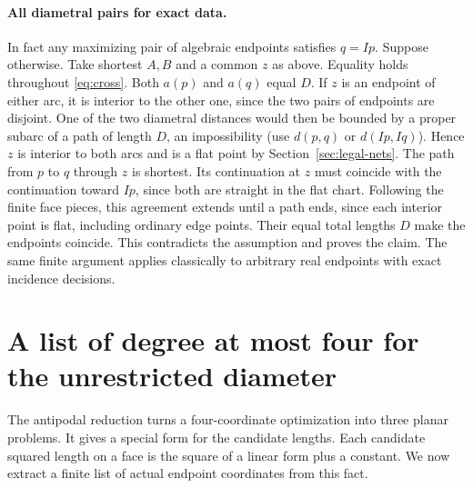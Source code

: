 \documentclass[10pt,letterpaper]{article}
\begin{document}
\paragraph{All diametral pairs for exact data.}
In fact any maximizing pair of algebraic endpoints satisfies $q=Ip$.
Suppose otherwise. Take shortest $A,B$ and a common $z$ as above.
Equality holds throughout \eqref{eq:cross}. Both $a(p)$ and $a(q)$
equal $D$. If $z$ is an endpoint of either arc, it is interior to the
other one, since the two pairs of endpoints are disjoint. One of the
two diametral distances would then be bounded by a proper subarc of
a path of length $D$, an impossibility (use $d(p,q)$ or $d(Ip,Iq)$).
Hence $z$ is interior to both arcs and is a flat point by
Section~\ref{sec:legal-nets}. The path from $p$ to $q$ through $z$
is shortest. Its continuation at $z$ must coincide with the continuation
toward $Ip$, since both are straight in the flat chart. Following the finite
face pieces, this agreement extends until a path ends, since each
interior point is flat, including ordinary edge points. Their equal
total lengths $D$ make the endpoints coincide. This contradicts the
assumption and proves the claim. The same finite argument applies
classically to arbitrary real endpoints with exact incidence decisions.

\section{A list of degree at most four for the unrestricted diameter}
\label{sec:quartic}
The antipodal reduction turns a four-coordinate optimization into three
planar problems. It gives a special form for the candidate lengths. Each candidate
squared length on a face is the square of a linear form plus a constant.
We now extract a finite list of actual endpoint coordinates from this fact.
\end{document}
